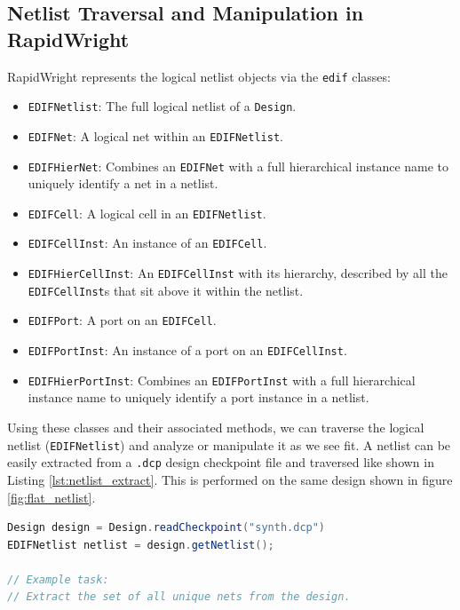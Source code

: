 \begin{multicols}{2}

\subsection{Netlist Traversal and Manipulation in RapidWright}

RapidWright represents the logical netlist objects via the \texttt{edif} classes:
\begin{itemize}
    \item \texttt{EDIFNetlist}: The full logical netlist of a \texttt{Design}. 
    \item \texttt{EDIFNet}: A logical net within an \texttt{EDIFNetlist}.
    \item \texttt{EDIFHierNet}: Combines an \texttt{EDIFNet} with a full hierarchical instance name to uniquely identify a net in a netlist.
    \item \texttt{EDIFCell}: A logical cell in an \texttt{EDIFNetlist}. 
    \item \texttt{EDIFCellInst}: An instance of an \texttt{EDIFCell}. 
    \item \texttt{EDIFHierCellInst}: An \texttt{EDIFCellInst} with its hierarchy, described by all the \texttt{EDIFCellInst}s that sit above it within the netlist.
    \item \texttt{EDIFPort}: A port on an \texttt{EDIFCell}. 
    \item \texttt{EDIFPortInst}: An instance of a port on an \texttt{EDIFCellInst}. 
    \item \texttt{EDIFHierPortInst}: Combines an \texttt{EDIFPortInst} with a full hierarchical instance name to uniquely identify a port instance in a netlist. 
\end{itemize}


Using these classes and their associated methods, we can traverse the logical netlist (\texttt{EDIFNetlist}) and analyze or manipulate it as we see fit. 
A netlist can be easily extracted from a \texttt{.dcp} design checkpoint file and traversed like shown in Listing \ref{lst:netlist_extract}. 
This is performed on the same design shown in figure \ref{fig:flat_netlist}.

\begin{lstlisting}[language=java, caption={Basic netlist extraction and traversal}, label={lst:netlist_extract}]
Design design = Design.readCheckpoint("synth.dcp")
EDIFNetlist netlist = design.getNetlist();

// Example task:
// Extract the set of all unique nets from the design.


\end{lstlisting}
\end{multicols}
